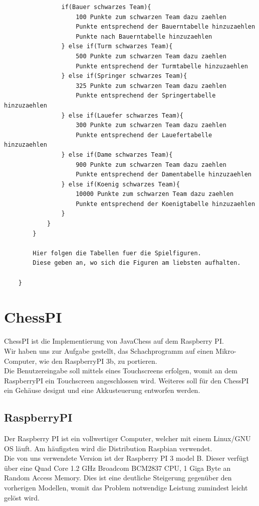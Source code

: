\documentclass[12pt,a4paper]{article}
\begin{document}
{\begin{lstlisting}
				if(Bauer schwarzes Team){
					100 Punkte zum schwarzen Team dazu zaehlen
					Punkte entsprechend der Bauerntabelle hinzuzaehlen
					Punkte nach Bauerntabelle hinzuzaehlen
				} else if(Turm schwarzes Team){
					500 Punkte zum schwarzen Team dazu zaehlen
					Punkte entsprechend der Turmtabelle hinzuzaehlen
				} else if(Springer schwarzes Team){
					325 Punkte zum schwarzen Team dazu zaehlen
					Punkte entsprechend der Springertabelle hinzuzaehlen
				} else if(Lauefer schwarzes Team){
					300 Punkte zum schwarzen Team dazu zaehlen
					Punkte entsprechend der Lauefertabelle hinzuzaehlen
				} else if(Dame schwarzes Team){
					900 Punkte zum schwarzen Team dazu zaehlen
					Punkte entsprechend der Damentabelle hinzuzaehlen
				} else if(Koenig schwarzes Team){
					10000 Punkte zum schwarzen Team dazu zaehlen
					Punkte entsprechend der Koenigtabelle hinzuzaehlen
				}
			}
		}
		
		Hier folgen die Tabellen fuer die Spielfiguren.
		Diese geben an, wo sich die Figuren am liebsten aufhalten.
		
	}	
\end{lstlisting}

\clearpage\vfill\newpage{}
\section{ChessPI}
\label{SEC:chesspi}

ChessPI ist die Implementierung von JavaChess auf dem Raspberry PI. \\
Wir haben uns zur Aufgabe gestellt, das Schachprogramm auf einen Mikro-Computer, wie den RaspberryPI 3b, zu portieren.\\
Die Benutzereingabe soll mittels eines Touchscreens erfolgen, womit an dem RaspberryPI ein Touchscreen angeschlossen wird. Weiteres soll für den ChessPI ein Gehäuse designt und eine Akkusteuerung entworfen werden. \\

\subsection{RaspberryPI}

Der Raspberry PI ist ein vollwertiger Computer, welcher mit einem Linux/GNU OS läuft. Am häufigsten wird die Distribution Raspbian verwendet. \\
Die von uns verwendete Version ist der Raspberry PI 3 model B. Dieser verfügt über eine Quad Core 1.2 GHz Broadcom BCM2837 CPU, 1 Giga Byte an Random Access Memory.\cite{RaspiSpecs} Dies ist eine deutliche Steigerung gegenüber den vorherigen Modellen, womit das Problem notwendige Leistung zumindest leicht gelöst wird. \\

}
\end{document}

